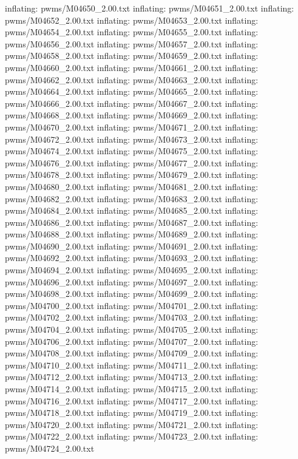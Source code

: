 \documentclass[letterpaper,10pt,english]{sphinxmanual}
\begin{document}
{\begin{sphinxVerbatim}[commandchars=\\\{\}]
  inflating: pwms/M04650\_2.00.txt
  inflating: pwms/M04651\_2.00.txt
  inflating: pwms/M04652\_2.00.txt
  inflating: pwms/M04653\_2.00.txt
  inflating: pwms/M04654\_2.00.txt
  inflating: pwms/M04655\_2.00.txt
  inflating: pwms/M04656\_2.00.txt
  inflating: pwms/M04657\_2.00.txt
  inflating: pwms/M04658\_2.00.txt
  inflating: pwms/M04659\_2.00.txt
  inflating: pwms/M04660\_2.00.txt
  inflating: pwms/M04661\_2.00.txt
  inflating: pwms/M04662\_2.00.txt
  inflating: pwms/M04663\_2.00.txt
  inflating: pwms/M04664\_2.00.txt
  inflating: pwms/M04665\_2.00.txt
  inflating: pwms/M04666\_2.00.txt
  inflating: pwms/M04667\_2.00.txt
  inflating: pwms/M04668\_2.00.txt
  inflating: pwms/M04669\_2.00.txt
  inflating: pwms/M04670\_2.00.txt
  inflating: pwms/M04671\_2.00.txt
  inflating: pwms/M04672\_2.00.txt
  inflating: pwms/M04673\_2.00.txt
  inflating: pwms/M04674\_2.00.txt
  inflating: pwms/M04675\_2.00.txt
  inflating: pwms/M04676\_2.00.txt
  inflating: pwms/M04677\_2.00.txt
  inflating: pwms/M04678\_2.00.txt
  inflating: pwms/M04679\_2.00.txt
  inflating: pwms/M04680\_2.00.txt
  inflating: pwms/M04681\_2.00.txt
  inflating: pwms/M04682\_2.00.txt
  inflating: pwms/M04683\_2.00.txt
  inflating: pwms/M04684\_2.00.txt
  inflating: pwms/M04685\_2.00.txt
  inflating: pwms/M04686\_2.00.txt
  inflating: pwms/M04687\_2.00.txt
  inflating: pwms/M04688\_2.00.txt
  inflating: pwms/M04689\_2.00.txt
  inflating: pwms/M04690\_2.00.txt
  inflating: pwms/M04691\_2.00.txt
  inflating: pwms/M04692\_2.00.txt
  inflating: pwms/M04693\_2.00.txt
  inflating: pwms/M04694\_2.00.txt
  inflating: pwms/M04695\_2.00.txt
  inflating: pwms/M04696\_2.00.txt
  inflating: pwms/M04697\_2.00.txt
  inflating: pwms/M04698\_2.00.txt
  inflating: pwms/M04699\_2.00.txt
  inflating: pwms/M04700\_2.00.txt
  inflating: pwms/M04701\_2.00.txt
  inflating: pwms/M04702\_2.00.txt
  inflating: pwms/M04703\_2.00.txt
  inflating: pwms/M04704\_2.00.txt
  inflating: pwms/M04705\_2.00.txt
  inflating: pwms/M04706\_2.00.txt
  inflating: pwms/M04707\_2.00.txt
  inflating: pwms/M04708\_2.00.txt
  inflating: pwms/M04709\_2.00.txt
  inflating: pwms/M04710\_2.00.txt
  inflating: pwms/M04711\_2.00.txt
  inflating: pwms/M04712\_2.00.txt
  inflating: pwms/M04713\_2.00.txt
  inflating: pwms/M04714\_2.00.txt
  inflating: pwms/M04715\_2.00.txt
  inflating: pwms/M04716\_2.00.txt
  inflating: pwms/M04717\_2.00.txt
  inflating: pwms/M04718\_2.00.txt
  inflating: pwms/M04719\_2.00.txt
  inflating: pwms/M04720\_2.00.txt
  inflating: pwms/M04721\_2.00.txt
  inflating: pwms/M04722\_2.00.txt
  inflating: pwms/M04723\_2.00.txt
  inflating: pwms/M04724\_2.00.txt

\end{sphinxVerbatim}}
\end{document}

